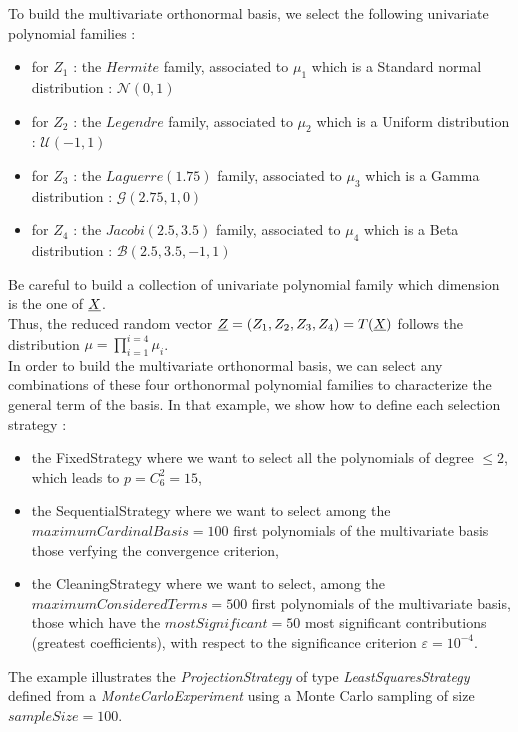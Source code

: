 To build the multivariate orthonormal basis, we select the following univariate polynomial families :
\begin{itemize}
\item for $Z_1$ : the $Hermite$ family, associated to  $\mu_1$ which is a Standard normal distribution : $\mathcal{N}(0,1)$
\item for $Z_2$ : the $Legendre$ family, associated to  $\mu_2$ which is a Uniform distribution : $\mathcal{U}(-1,1)$
\item for $Z_3$ : the $Laguerre(1.75)$ family, associated to  $\mu_3$ which is a Gamma distribution : $\mathcal{G}(2.75,1,0)$
\item for $Z_4$ : the $Jacobi(2.5, 3.5)$ family, associated to  $\mu_4$ which  is a Beta distribution : $\mathcal{B}(2.5, 3.5,-1,1)$
\end{itemize}
Be careful to build a collection of univariate polynomial family which dimension is the one of ${\underline{X}}$.\\

Thus, the reduced random vector ${\underline{Z}}=(Z_1,Z_2,Z_3,Z_4) = T({\underline{X}})$ follows the distribution $\mu = \prod_{i=1}^{i=4} \mu_i$.\\

In order to build the multivariate orthonormal basis, we can select any combinations of these four orthonormal polynomial families to characterize the general term of the basis.  In that example, we show how to define each selection strategy :
\begin{itemize}
\item the FixedStrategy where we want to select all the polynomials of degree $\leq 2$, which leads to $p=C_6^2 = 15$,
\item the SequentialStrategy where we want to select among the $maximumCardinalBasis = 100$ first polynomials of the multivariate basis those verfying the convergence criterion,
\item the CleaningStrategy where we want to select, among the $maximumConsideredTerms = 500$ first polynomials of the multivariate basis, those which have the $mostSignificant = 50$ most significant contributions (greatest coefficients), with respect to the significance criterion $\varepsilon = 10^{-4}$.
\end{itemize}

The example illustrates the \emph{ProjectionStrategy} of type \emph{LeastSquaresStrategy} defined from a \emph{MonteCarloExperiment} using a  Monte Carlo sampling of size  $sampleSize = 100$. \\


